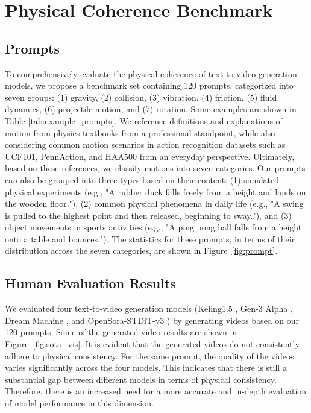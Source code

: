 \section{Physical Coherence Benchmark}



\subsection{Prompts}
To comprehensively evaluate the physical coherence of text-to-video generation models, we propose a benchmark set containing 120 prompts, categorized into seven groups: (1) gravity, (2) collision, (3) vibration, (4) friction, (5) fluid dynamics, (6) projectile motion, and (7) rotation. Some examples are shown in Table \ref{tab:example_prompts}. We reference definitions and explanations of motion from physics textbooks from a professional standpoint, while also considering common motion scenarios in action recognition datasets such as UCF101\cite{ucf101}, PennAction\cite{pennaction}, and HAA500\cite{haa500} from an everyday perspective. Ultimately, based on these references, we classify motions into seven categories. Our prompts can also be grouped into three types based on their content: (1) simulated physical experiments (e.g., "A rubber duck falls freely from a height and lands on the wooden floor."), (2) common physical phenomena in daily life (e.g., "A swing is pulled to the highest point and then released, beginning to sway."), and (3) object movements in sports activities (e.g., "A ping pong ball falls from a height onto a table and bounces."). The statistics for these prompts, in terms of their distribution across the seven categories, are shown in Figure~\ref{fig:prompt}.








\subsection{Human Evaluation Results}
We evaluated four text-to-video generation models (Keling1.5 \cite{keling}, Gen-3 Alpha \cite{runway}, Dream Machine \cite{luma}, and OpenSora-STDiT-v3 \cite{opensora}) by generating videos based on our 120 prompts. Some of the generated video results are shown in Figure~\ref{fig:sota_vis}. It is evident that the generated videos do not consistently adhere to physical consistency. For the same prompt, the quality of the videos varies significantly across the four models. This indicates that there is still a substantial gap between different models in terms of physical consistency. Therefore, there is an increased need for a more accurate and in-depth evaluation of model performance in this dimension.



